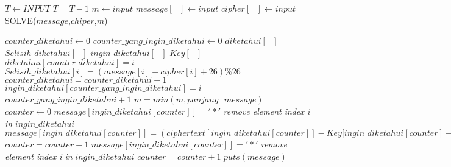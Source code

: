 \documentclass[11pt]{article}
\begin{document}
\begin{algorithm}[H]
    \begin{algorithmic}[1]
			\State $T \leftarrow INPUT$
				\State $T=T-1$
				\State $m \gets input$      
				\State $message [\textrm{ }] \gets input$    
				\State $cipher [\textrm{ }] \gets input$     
				\State SOLVE($message$,$chiper$,$m$)
            \EndWhile
        \EndFunction
    \end{algorithmic}
\end{algorithm}

\begin{algorithm}[H]
	\centering
    \begin{algorithmic}[1]
			\State $counter\_diketahui \gets 0 $            
            \State $counter\_yang\_ingin\_diketahui \gets 0$
            \State $diketahui [\textrm{ }]$
            \State $Selisih\_diketahui [\textrm{ }]$
            \State $ingin\_diketahui [\textrm{ }]$
            \State $Key [\textrm{ }]$
                    \State $diketahui[counter\_diketahui]=i$
                    \State $Selisih\_diketahui[i]=(message[i]-cipher[i]+26)\%26$
                    \State $counter\_diketahui = counter\_diketahui+1$
                	\State $ingin\_diketahui[counter\_yang\_ingin\_diketahui]=i$
                	\State $counter\_yang\_ingin\_diketahui + 1 $
                \EndIf
            \EndFor
            \State $m=min(m,panjang \textrm{ } message)$
					\State $counter \gets 0$
							\State $message[ingin\_diketahui[counter]] ='*'$
							\State \textit{remove element index i in }$ingin\_diketahui$
							\State $message[ingin\_diketahui[counter]]=(ciphertext[ingin\_diketahui[counter]]-Key[ingin\_diketahui[counter] + 26) \% 26$
							\State $counter=counter+1$
						\ElsIf{$message[ingin\_diketahui[counter]] \neq \textrm{ } (ciphertext[ingin\_diketahui[counter]]\textrm{ } -Key[ingin\_diketahui[counter] + 26)\textrm{ } \% 26$)}
							\State $message[ingin\_diketahui[counter]] ='*'$
							\State \textit{remove element index i in }$ingin\_diketahui$
						\Else
							\State $counter=counter+1$
						\EndIf
					\EndWhile
            	\EndIf
            \EndFor
            \State $puts(message)$
        \EndFunction
    \end{algorithmic}
\end{algorithm}
\end{document}
